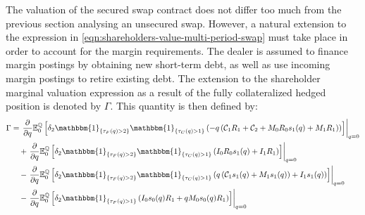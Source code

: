 \documentclass[main.tex]{subfiles}
\begin{document}
        The valuation of the secured swap contract does not differ too much from the previous section analysing an unsecured swap.
        However, a natural extension to the expression in \cref{eqn:shareholders-value-multi-period-swap}
        must take place in order to account for the margin requirements.
        The dealer is assumed to finance margin postings by obtaining new short-term debt,
        as well as use incoming margin postings to retire existing debt.
        The extension to the shareholder marginal valuation expression
        as a result of the fully collateralized hedged position is denoted by $\Gamma$.
        This quantity is then defined by:
        \begin{align}
            \Gamma &=
            \left.\frac{\partial}{\partial q}
            \mathbb{E}_{0}^{\rnmeasure}\left[
                \delta_2 \mathbbm{1}_{\{\tau_{F}(q)>2\}}
                \mathbbm{1}_{\{\tau_{C}(q)>1\}}
                \left(
                    - q\left(\mathcal{C}_1 R_1 + \mathcal{C}_2
                    + M_0 R_0 s_1(q)
                    + M_1 R_1\right)
                \right) 
            \right]\right\rvert_{q=0}
            \nonumber
            \\
            &\quad+
            \left.\frac{\partial}{\partial q}
            \mathbb{E}_{0}^{\rnmeasure}\left[
                \delta_2 \mathbbm{1}_{\{\tau_{F}(q)>2\}}
                \mathbbm{1}_{\{\tau_{C}(q)>1\}}
                \left(
                    I_0 R_0 s_1(q)
                    + I_1 R_1
                \right) 
            \right]\right\rvert_{q=0}
            \nonumber
            \\
            &\quad-
            \left.\frac{\partial}{\partial q}
            \mathbb{E}_{0}^{\rnmeasure}\left[
                \delta_2 \mathbbm{1}_{\{\tau_{F}(q)>2\}}
                \mathbbm{1}_{\{\tau_{C}(q)>1\}}
                \left(
                    q\left(\mathcal{C}_{1} s_{1}(q)
                    + M_1 s_{1}(q)\right)
                    + I_1 s_{1}(q)
                \right)
            \right]\right\rvert_{q=0}
            \nonumber
            \\
            &\quad-
            \left.\frac{\partial}{\partial q}
            \mathbb{E}_{0}^{\rnmeasure}\left[
                \delta_2 \mathbbm{1}_{\{\tau_{F}(q)>1\}}
                \left(
                    I_0 s_{0}(q) R_{1}
                    + qM_0 s_{0}(q) R_{1}
                \right) 
            \right]\right\rvert_{q=0}
            \label{eqn:sharholders-value-hedged-swap-step-1}
        \end{align}
\end{document}
